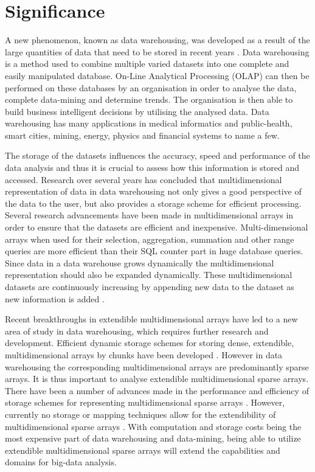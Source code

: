 \section{Significance}
A new phenomenon, known as data warehousing, was developed as a result of the large quantities of data that need to be stored in recent years \cite{golfarelli:2009:dwd}. Data warehousing is a method used to combine multiple varied datasets into one complete and easily manipulated database. On-Line Analytical Processing (OLAP) can then be performed on these databases by an organisation in order to analyse the data, complete data-mining and determine trends. The organisation is then able to build business intelligent decisions by utilising the analysed data. Data warehousing has many applications in medical informatics and public-health, smart cities, mining, energy, physics and financial systems to name a few.

The storage of the datasets influences the accuracy, speed and performance of the data analysis and thus it is crucial to assess how this information is stored and accessed. Research over several years has concluded that multidimensional representation of data in data warehousing not only gives a good perspective of the data to the user, but also provides a storage scheme for efficient processing. Several research advancements have been made in multidimensional arrays in order to ensure that the datasets are efficient and inexpensive. Multi-dimensional arrays when used for their selection, aggregation, summation and other range queries are more efficient than their SQL counter part in huge database queries. Since data in a data warehouse grows dynamically the multidimensional representation should also be expanded dynamically. These multidimensional datasets are continuously increasing by appending new data to the dataset as new information is added \cite{otoo:2006:esa}.

Recent breakthroughs in extendible multidimensional arrays have led to a new area of study in data warehousing, which requires further research and development. Efficient dynamic storage schemes for storing dense, extendible, multidimensional arrays by chunks have been developed \cite{nimako:2012:ced,pedereira:2015:cas}. However in data warehousing the corresponding multidimensional arrays are predominantly sparse arrays. It is thus important to analyse extendible multidimensional sparse arrays. There have been a number of advances made in the performance and efficiency of storage schemes for representing multidimensional sparse arrays \cite{otoo:2016:msa,goil:bess,otoo:2014:nas}. However, currently no storage or mapping techniques allow for the extendibility of multidimensional sparse arrays \cite{nimako:2016:cea}. With computation and storage costs being the most expensive part of data warehousing and data-mining, being able to utilize extendible multidimensional sparse arrays will extend the capabilities and domains for big-data analysis. %


